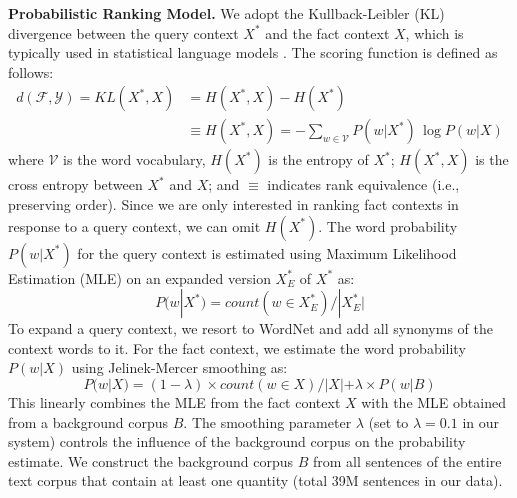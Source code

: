 \noindent \textbf{Probabilistic Ranking Model.} We adopt the Kullback-Leibler (KL) divergence between the query context $X^*$ and the fact context $X$, which is typically used in statistical language models \cite{DBLP:journals/ftir/Zhai08}. The scoring function is defined as follows:
\begin{align*}
d(\mathcal{F}, \mathcal{Y}) = \textit{KL}(X^*, X) &= H(X^*, X) - H(X^*) \\ &\equiv H(X^*, X) 
= -\sum_{w \in \mathcal{V}} P(w|X^*)\,\log P(w|X)
\end{align*}
where $\mathcal{V}$ is the word vocabulary, $H(X^*)$ is the entropy of $X^*$; $H(X^*, X)$ is the cross entropy between $X^*$ and $X$; and $\equiv$ indicates rank equivalence
(i.e., preserving order). 
Since we are only interested in ranking fact contexts in response to a query context, we can omit $H(X^*)$. The word probability $P(w|X^*)$ for the query context is estimated using Maximum Likelihood Estimation (MLE) on an expanded version $X^*_E$ of $X^*$ as:
\[P(w|X^*) = count(w \in X^*_E)/|X^*_E|\]
To expand a query context, we resort to WordNet \cite{Miller:1995:WLD:219717.219748} and add all synonyms of the context words to it. For the fact context, we estimate the word probability $P(w|X)$ using Jelinek-Mercer smoothing 
 as:
\[P(w|X) = (1 - \lambda) \times count(w \in X)/|X| + \lambda \times P(w|B)\]
This linearly combines the MLE from the fact context $X$ with the MLE obtained from a background corpus $B$. The smoothing parameter $\lambda$ (set to $\lambda=0.1$ in our system) controls the influence of the background corpus on the probability estimate. We construct the background corpus $B$ from all sentences of the entire text corpus that contain at least one quantity (total 39M sentences in our data). \\




